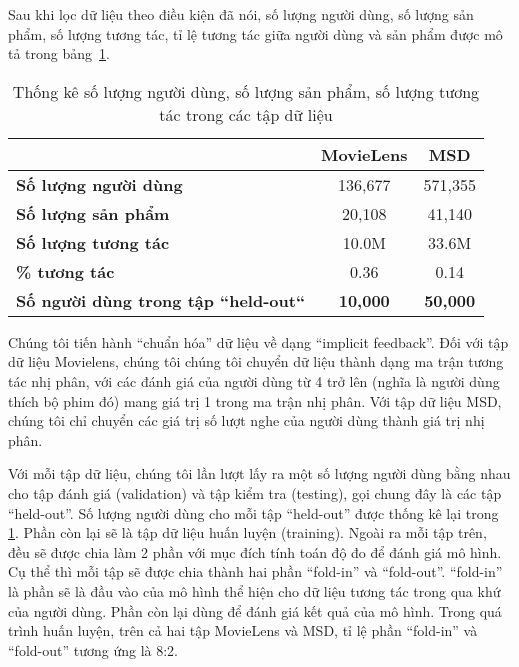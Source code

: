 Sau khi lọc dữ liệu theo điều kiện đã nói, số lượng người dùng, số lượng sản phẩm, số lượng tương tác, tỉ lệ tương tác giữa người dùng và sản phẩm được mô tả trong bảng~\ref{table_dataset}.
\begin{table}[]
\centering
    \begin{tabular}{|l|c|c|}
    \hline
                                                & \textbf{MovieLens} & \textbf{MSD}    \\ \hline
    \textbf{Số lượng người dùng}                  & 136,677            & 571,355         \\ \hline
    \textbf{Số lượng sản phẩm}                    & 20,108             & 41,140          \\ \hline
    \textbf{Số lượng tương tác}                   & 10.0M              & 33.6M           \\ \hline
    \textbf{\% tương tác}                         & 0.36               & 0.14            \\ \hline
    \textbf{Số người dùng trong tập ``held-out``} & \textbf{10,000}    & \textbf{50,000} \\ \hline
    \end{tabular}
   
    \caption{Thống kê số lượng người dùng, số lượng sản phẩm, số lượng tương tác trong các tập dữ liệu}
    \label{table_dataset}    
\end{table}


Chúng tôi tiến hành ``chuẩn hóa'' dữ liệu về dạng ``implicit feedback''. Đối với tập dữ liệu Movielens, chúng tôi 
chúng tôi chuyển dữ liệu thành dạng ma trận tương tác nhị phân, với các đánh giá của người dùng từ 4 trở lên (nghĩa là người dùng thích bộ phim đó) mang giá trị 1 trong ma trận nhị phân.
Với tập dữ liệu MSD, chúng tôi chỉ chuyển các giá trị số lượt nghe của người dùng thành giá trị nhị phân.

Với mỗi tập dữ liệu, chúng tôi lần lượt lấy ra một số lượng người dùng bằng nhau cho tập đánh giá (validation) và tập kiểm tra (testing), gọi chung đây là các tập ``held-out''. 
Số lượng người dùng cho mỗi tập ``held-out'' được thống kê lại trong \ref{table_dataset}.
Phần còn lại sẽ là tập dữ liệu huấn luyện (training).
Ngoài ra mỗi tập trên, đều sẽ được chia làm 2 phần với mục đích tính toán độ đo để đánh giá mô hình.
Cụ thể thì mỗi tập sẽ được chia thành hai phần ``fold-in'' và ``fold-out''.
``fold-in'' là phần sẽ là đầu vào của mô hình thể hiện cho dữ liệu tương tác trong qua khứ của người dùng. 
Phần còn lại dùng để đánh giá kết quả của mô hình.
Trong quá trình huấn luyện, trên cả hai tập MovieLens và MSD, tỉ lệ phần ``fold-in'' và ``fold-out'' tương ứng là 8:2.


